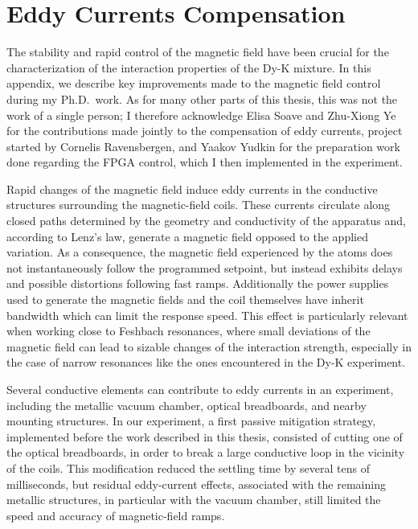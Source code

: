 \chapter{Eddy Currents Compensation}
\label{app:MagneticField}

The stability and rapid control of the magnetic field have been crucial for the characterization of the interaction properties of the Dy-K mixture. In this appendix, we describe key improvements made to the magnetic field control during my Ph.D.~work. As for many other parts of this thesis, this was not the work of a single person; I therefore acknowledge Elisa Soave and Zhu-Xiong Ye for the contributions made jointly to the compensation of eddy currents, project started by Cornelis Ravensbergen, and Yaakov Yudkin for the preparation work done regarding the \ac{FPGA} control, which I then implemented in the experiment.


Rapid changes of the magnetic field induce eddy currents in the conductive structures surrounding the magnetic-field coils. These currents circulate along closed paths determined by the geometry and conductivity of the apparatus and, according to Lenz's law, generate a magnetic field opposed to the applied variation. As a consequence, the magnetic field experienced by the atoms does not instantaneously follow the programmed setpoint, but instead exhibits delays and possible distortions following fast ramps. Additionally the power supplies used to generate the magnetic fields and the coil themselves have inherit bandwidth which can limit the response speed. This effect is particularly relevant when working close to Feshbach resonances, where small deviations of the magnetic field can lead to sizable changes of the interaction strength, especially in the case of narrow resonances like the ones encountered in the Dy-K experiment.

Several conductive elements can contribute to eddy currents in an experiment, including the metallic vacuum chamber, optical breadboards, and nearby mounting structures. In our experiment, a first passive mitigation strategy, implemented before the work described in this thesis, consisted of cutting one of the optical breadboards, in order to break a large conductive loop in the vicinity of the coils. This modification reduced the settling time by several tens of milliseconds, but residual eddy-current effects, associated with the remaining metallic structures, in particular with the vacuum chamber, still limited the speed and accuracy of magnetic-field ramps.

